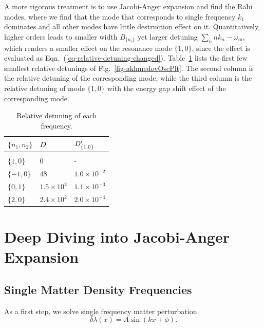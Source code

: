 A more rigorous treatment is to use Jacobi-Anger expansion and find the Rabi modes, where we find that the mode that corresponds to single frequency $k_1$ dominates and all other modes have little destruction effect on it. Quantitatively, higher orders leads to smaller width $B_{\{n_i\}}$ yet larger detuning $\sum_{n} nk_n-\omega_{\mathrm m}$, which renders a smaller effect on the resonance mode $\{1,0\}$, since the effect is evaluated as Eqn.~(\ref{eq-relative-detuning-changed}).
Table~\ref{tab-q-values-each-mode} lists the first few smallest relative detunings of Fig.~\ref{fig-akhmedovOscPlt}. The second column is the relative detuning of the corresponding mode, while the third column is the relative detuning of mode $\{1,0\}$ with the energy gap shift effect of the corresponding mode.




\begin{table}
\caption{\label{tab-q-values-each-mode}Relative detuning of each frequency.}
\begin{tabular}{lll}
 $\{n_1,n_2\}$ &  $D$ & $D'_{\{1,0\}}$   \\
\hline \\
 $\{1,0\}$ & $0$ &  - \\
 $\{-1,0\}$ & $48$ &  $1.0\times 10^{-2}$ \\
 $\{0,1\}$ & $1.5\times 10^2$ &  $1.1\times 10^{-3}$  \\
 $\{2,0\}$ & $2.4\times 10^{2}$ & $2.0\times 10^{-4}$
\end{tabular}
\end{table}


\section{\label{chap:matter-sec:deep-jacobi}Deep Diving into Jacobi-Anger Expansion}


\subsection{\label{chap:matter-sec:deep-jacobi-subsec:single-matter-freq}Single Matter Density Frequencies}

As a first step, we solve single frequency matter perturbation
\begin{equation}
   \delta \lambda(x)  = A \sin (k x + \phi). 
\end{equation}

